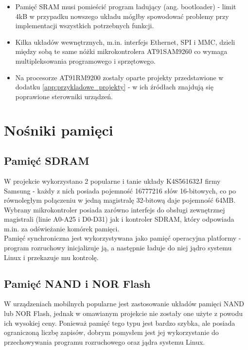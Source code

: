 \documentclass[a4paper,12pt]{book}
\begin{document}
			\begin{itemize}
				\item Pamięć SRAM musi pomieścić program ładujący (ang. bootloader) - limit 4kB w przypadku nowszego układu mógłby spowodować problemy przy implementacji wszystkich potrzebnych funkcji.
				\item Kilka układów wewnętrznych, m.in. interfejs Ethernet, SPI i MMC, dzieli między sobą te same nóżki mikrokontrolera AT91SAM9260 co wymaga multipleksowania programowego i sprzętowego.
				\item Na procesorze AT91RM9200 zostały oparte projekty przedstawione w dodatku \ref{app:przykladowe_projekty} - w ich źródłach znajdują się poprawione sterowniki urządzeń.
			\end{itemize}
		\section{Nośniki pamięci}
			\subsection{Pamięć SDRAM}			
				W projekcie wykorzystano 2 popularne i tanie układy K4S561632J firmy Samsung - każdy z nich posiada pojemność 16777216 słów 16-bitowych, co po równoległym połączeniu w jedną magistralę 32-bitową daje pojemność 64MB. \\
				Wybrany mikrokontroler posiada zarówno interfejs do obsługi zewnętrznej magistrali (linie A0-A25 i D0-D31) jak i kontroler SDRAM, który odpowiada m.in. za odświeżanie komórek pamięci.\\
				Pamięć synchroniczna jest wykorzystywana jako pamięć operacyjna platformy - program rozruchowy inicjalizuje ją, a następnie ładuje do niej jądro systemu Linux i przekazuje mu kontrolę.
				
			\subsection{Pamięć NAND i NOR Flash}
				W urządzeniach mobilnych popularne jest zastosowanie układów pamięci NAND lub NOR Flash, jednak w omawianym projekcie nie zostały one użyte z powodu ich wysokiej ceny. Ponieważ pamięć tego typu jest bardzo szybka, ale posiada ograniczoną liczbę zapisów, dobrym pomysłem jest jej wykorzystanie do przechowywania programu rozruchowego oraz jądra systemu Linux.
				
\end{document}
